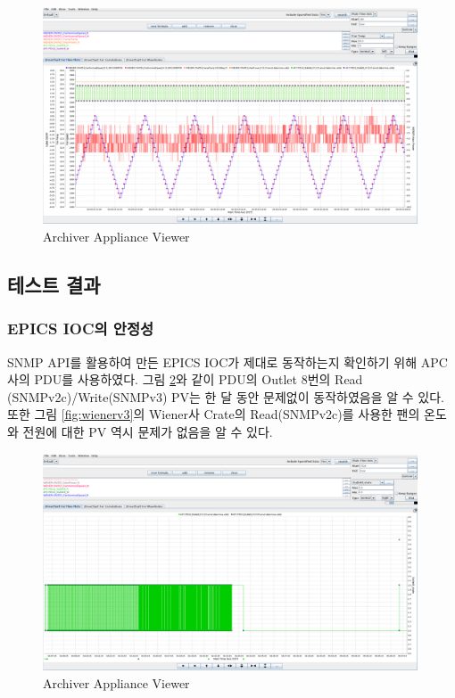 \documentclass[11pt
  , a4paper
  , article
  , oneside
]{memoir}
\begin{document}
\begin{figure}[h!]
  \centering
  \includegraphics[width=0.99\textwidth]{./images/aaviewer_3.eps}
  \caption{Archiver Appliance Viewer}
  \label{fig:aaviewer}   
\end{figure}

\subsection{테스트 결과}

\subsubsection{EPICS IOC의 안정성}
SNMP API를 활용하여 만든 EPICS IOC가 제대로 동작하는지 확인하기 위해 APC사의 PDU를 사용하였다. 그림 \ref{fig:outlet}와 같이 PDU의 Outlet 8번의 Read (SNMPv2c)/Write(SNMPv3) PV는 한 달 동안 문제없이 동작하였음을 알 수 있다. 또한 그림 \ref{fig:wienerv3}의 Wiener사 Crate의 Read(SNMPv2c)를 사용한 팬의 온도와 전원에 대한 PV 역시 문제가 없음을 알 수 있다.


\begin{figure}[h!]
  \centering
  \includegraphics[width=0.99\textwidth]{./images/0507_archiver_wiener_outlet8_2.eps}
  \caption{Archiver Appliance Viewer}
  \label{fig:outlet}   
\end{figure}
\end{document}
